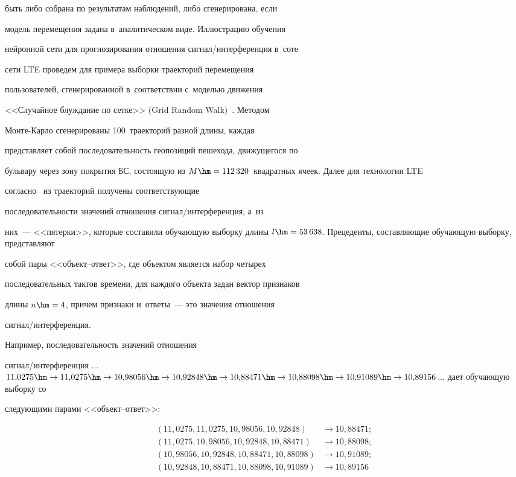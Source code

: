 быть либо собрана по результатам наблюдений, либо сгенерирована, если 


модель перемещения задана в~аналитическом виде. Иллюстрацию обучения 


нейронной сети для прогнозирования отношения сиг\-нал\!/\!ин\-тер\-фе\-рен\-ция в~соте 


сети LTE проведем для примера выборки траекторий перемещения 


пользователей, сгенерированной в~соответствии с~моделью движения 


<<Случайное блуж\-да\-ние по сетке>> (Grid Random Walk)~\cite{5-bob}. Методом  


Мон\-те-Кар\-ло сгенерированы 100~траекторий разной длины, каждая 


представляет собой последовательность геопозиций пешехода, движущегося по 


бульвару через зону покрытия БС, состоящую из $M\hm= 


112\,320$~квадратных ячеек. Далее для технологии LTE 


 согласно~\cite{1-bob, 5-bob} из траекторий получены соответствующие 


последовательности значений отношения сиг\-нал\!/\!ин\-тер\-фе\-рен\-ция, а~из 


них~--- <<пятерки>>, которые составили обучающую выборку длины $l\hm= 


53\,638$. Прецеденты, составляющие обучающую выборку, представляют 


собой пары <<объ\-ект--от\-вет>>, где объектом является набор четырех 


последовательных тактов времени, для каждого объекта задан вектор признаков 


длины $n\hm=4$, причем признаки и~ответы~--- это значения отношения  


сиг\-нал\!/\!ин\-тер\-фе\-рен\-ция. 


  


  Например, последовательность значений отношения  


сиг\-нал\!/\!ин\-тер\-фе\-рен\-ция $\ldots$$11{,}0275 \hm\to 11{,}0275 \hm\to 


10{,}98056 \hm\to 10{,}92848 \hm\to 10{,}88471 \hm\to 10{,}88098 \hm\to 


10{,}91089 \hm\to 10{,}89156$$\ldots$ дает обучающую выборку со 


следующими парами <<объ\-ект--от\-вет>>: 


  \begin{align*}


  (11{,}0275, 11{,}0275, 10{,}98056, 10{,}92848) &\to10{,}88471;\\


  (11{,}0275, 10{,}98056, 10{,}92848, 10{,}88471)&\to10{,}88098;\\


  (10{,}98056, 10{,}92848, 10{,}88471, 10{,}88098)&\to10{,}91089;\\


  (10{,}92848, 10{,}88471, 10{,}88098, 10{,}91089)&\to10{,}89156 


  \end{align*}


